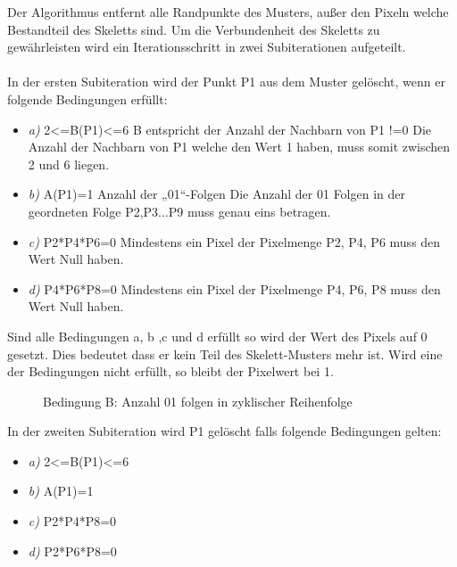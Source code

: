 Der Algorithmus entfernt alle Randpunkte des Musters, außer den Pixeln welche Bestandteil des Skeletts sind. Um die Verbundenheit des Skeletts zu gewährleisten wird ein  Iterationsschritt in zwei Subiterationen aufgeteilt.\\\\
In der ersten Subiteration wird der Punkt P1 aus dem Muster gelöscht, wenn er folgende Bedingungen erfüllt:
\begin{itemize} 
\item \emph{a)} 2<=B(P1)<=6     
B entspricht der Anzahl der Nachbarn von P1 !=0
Die Anzahl der Nachbarn von P1 welche den Wert 1 haben, muss somit zwischen 2 und 6 liegen.
\item \emph{b)}  A(P1)=1
Anzahl der „01“-Folgen 
Die Anzahl der 01 Folgen in der geordneten Folge P2,P3...P9 muss genau eins betragen.
\item \emph{c)}  P2*P4*P6=0  
Mindestens ein Pixel der Pixelmenge P2, P4, P6 muss den Wert Null haben.
\item \emph{d)}  P4*P6*P8=0
Mindestens ein Pixel der Pixelmenge P4, P6, P8 muss den Wert Null haben.
\end {itemize}
Sind alle Bedingungen a, b ,c und d erfüllt so wird der Wert des Pixels auf 0 gesetzt.
Dies bedeutet dass er kein Teil des Skelett-Musters mehr ist.
Wird eine der Bedingungen nicht erfüllt, so bleibt der Pixelwert bei 1.\\
\begin{figure}[!ht]
  \centering
   \caption{Bedingung B: Anzahl 01 folgen in zyklischer Reihenfolge  }
\end{figure}

In der zweiten Subiteration wird P1 gelöscht falls folgende Bedingungen gelten:
\begin{itemize} 
\item \emph{a)}  2<=B(P1)<=6 
\item \emph{b)}  A(P1)=1 
\item \emph{c)}  P2*P4*P8=0 
\item \emph{d)}  P2*P6*P8=0
\end{itemize}

